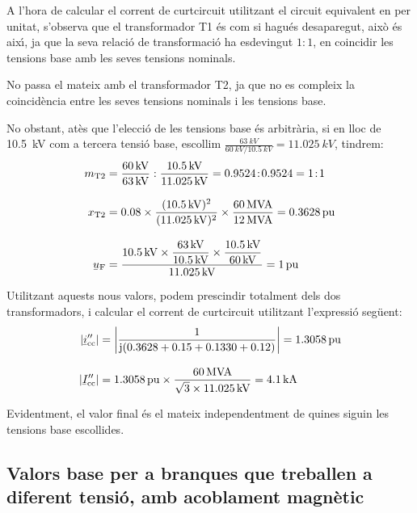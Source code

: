 \begin{exemple}
     A l'hora de calcular el corrent de curtcircuit utilitzant el circuit equivalent en per unitat,
     s'observa que el transformador T1 \'{e}s com si hagu\'{e}s desaparegut,
     aix\`{o} \'{e}s aix\'{\i}, ja que la seva relaci\'{o} de transformaci\'{o} ha esdevingut
     $1\!:\!1$, en coincidir les tensions base amb les seves tensions nominals.

     No passa el mateix amb el transformador T2, ja que no es compleix
     la coincid\`{e}ncia entre les seves tensions nominals i les tensions
     base.

     No obstant, at\`{e}s que l'elecci\'{o} de les tensions base \'{e}s
     arbitr\`{a}ria, si en lloc de \SI{10,5}{kV} com a tercera tensi\'{o} base,
     escollim
     $\frac{\SI{63}{kV}}{\SI{60}{kV} / \SI{10,5}{kV}}=\SI{11,025}{kV}$,
     tindrem:
    \begin{align*}
       m\ped{T2} &= \frac{60\unit{kV}}{63\unit{kV}} : \frac{\SI{10,5}{kV}}{\SI{11,025}{kV}}
       = \num{0,9524}\!:\!\num{0,9524} = 1\!:\!1 \\[3mm]
       x\ped{T2} &= \num{0,08} \times \frac{(\SI{10,5}{kV})^2}{(\SI{11,025}{kV})^2 } \times
       \frac{60\unit{MVA}}{12\unit{MVA}}  = \SI{0,3628}{pu}\\[3mm]
       \cmplx{u}\ped{F} &= \frac{\SI{10,5}{kV} \times \dfrac{63\unit{kV}}{\SI{10,5}{kV}} \times
       \dfrac{\SI{10,5}{kV}}{60\unit{kV}}}{\SI{11,025}{kV}} = 1\unit{pu}
    \end{align*}

    Utilitzant aquests nous valors, podem prescindir totalment dels dos
    transformadors, i calcular el corrent de curtcircuit utilitzant
    l'expressi\'{o} seg\"{u}ent:
    \begin{align*}
    |\cmplx{i}''\ped{cc}| &= \left| \frac{1}{\ju ( \num{0,3628} + \num{0,15} +
    \num{0,1330} + \num{0,12} )} \right| = \SI{1,3058}{pu} \\[3mm]
    |\cmplx{I}''\ped{cc}| &=
    \SI{1,3058}{pu}\times\frac{60\unit{MVA}}{\sqrt{3}\times \SI{11,025}{kV}} =
    \SI{4,1}{kA}
    \end{align*}

    Evidentment, el valor final \'{e}s el mateix independentment de quines
    siguin les tensions base escollides.
\end{exemple}

\subsection{Valors base per a branques que treballen a diferent tensi\'{o}, amb acoblament magn\`{e}tic}

